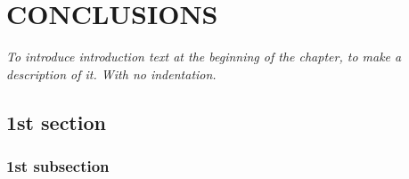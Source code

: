 
\chapter{CONCLUSIONS} %
\label{Conclusions}

\vspace*{3\baselineskip} %

\noindent \textit{To introduce introduction text at the beginning of the chapter, to make a description of it. With no indentation.}

\section{1st section}

\blindtext

\subsection{1st subsection}